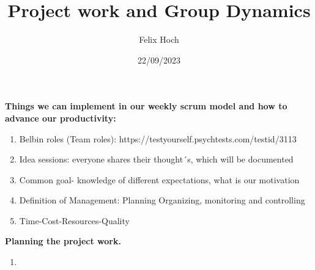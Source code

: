 \documentclass[11pt]{article}
\title{Project work and Group Dynamics}
\date{22/09/2023}
\author{Felix Hoch}
\begin{document}
\maketitle
\textbf{Things we can implement in our weekly scrum model and how to advance our productivity:}
\begin{enumerate}
    \item Belbin roles (Team roles): https://testyourself.psychtests.com/testid/3113 
    \item Idea sessions: everyone shares their thought´s, which will be documented
    \item Common goal- knowledge of different expectations, what is our motivation
    \item Definition of Management: Planning Organizing, monitoring and controlling
    \item Time-Cost-Resources-Quality
\end{enumerate}
\textbf{Planning the project work.}
\begin{enumerate}
    \item 
\end{enumerate}
\end{document}
